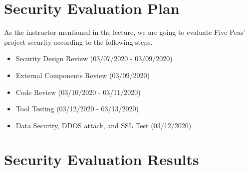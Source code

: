 \documentclass[12pt, a4paper]{article}
\begin{document}

\section{Security Evaluation Plan}


As the instructor mentioned in the lecture, we are going to evaluate Five Peas' project security according to the following steps.

\begin{itemize}
    \item Security Design Review (03/07/2020 - 03/09/2020)
    \item External Components Review (03/09/2020)
    \item Code Review (03/10/2020 - 03/11/2020)
    \item Tool Testing (03/12/2020 - 03/13/2020)
    \item Data Security, DDOS attack, and SSL Test (03/12/2020) 
\end{itemize}
    

\section{Security Evaluation Results}
\end{document}
